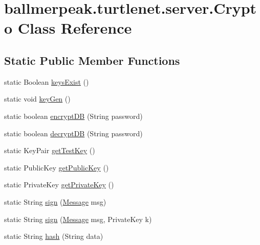 \hypertarget{classballmerpeak_1_1turtlenet_1_1server_1_1Crypto}{\section{ballmerpeak.\-turtlenet.\-server.\-Crypto Class Reference}
\label{classballmerpeak_1_1turtlenet_1_1server_1_1Crypto}
}
\subsection*{Static Public Member Functions}
\begin{DoxyCompactItemize}
\item 
static Boolean \hyperlink{classballmerpeak_1_1turtlenet_1_1server_1_1Crypto_a4d363a946bc16a383bb3516a6819e06f}{keys\-Exist} ()
\item 
static void \hyperlink{classballmerpeak_1_1turtlenet_1_1server_1_1Crypto_ae3a1070020af2f98bfb23284115f1b97}{key\-Gen} ()
\item 
static boolean \hyperlink{classballmerpeak_1_1turtlenet_1_1server_1_1Crypto_a028cefbca14291fa686b27c36f3b212a}{encrypt\-D\-B} (String password)
\item 
static boolean \hyperlink{classballmerpeak_1_1turtlenet_1_1server_1_1Crypto_a0faed916bbc35f2f01c4a09a52c008df}{decrypt\-D\-B} (String password)
\item 
static Key\-Pair \hyperlink{classballmerpeak_1_1turtlenet_1_1server_1_1Crypto_a2e95210ca85eb6273d47a1bde6be22e4}{get\-Test\-Key} ()
\item 
static Public\-Key \hyperlink{classballmerpeak_1_1turtlenet_1_1server_1_1Crypto_a830f62b5e45e6d1f424c3340b80d90c2}{get\-Public\-Key} ()
\item 
static Private\-Key \hyperlink{classballmerpeak_1_1turtlenet_1_1server_1_1Crypto_af6bfe6ea68cff3020c22221361f2d7f2}{get\-Private\-Key} ()
\item 
static String \hyperlink{classballmerpeak_1_1turtlenet_1_1server_1_1Crypto_a3551509d86a909950bb4c44ae1803240}{sign} (\hyperlink{classballmerpeak_1_1turtlenet_1_1shared_1_1Message}{Message} msg)
\item 
static String \hyperlink{classballmerpeak_1_1turtlenet_1_1server_1_1Crypto_aaa857c040134654c8d6187cb4f4090b5}{sign} (\hyperlink{classballmerpeak_1_1turtlenet_1_1shared_1_1Message}{Message} msg, Private\-Key k)
\item 
static String \hyperlink{classballmerpeak_1_1turtlenet_1_1server_1_1Crypto_a359e1b82e7bf6ff8018bed7829850def}{hash} (String data)

\end{DoxyCompactItemize}
